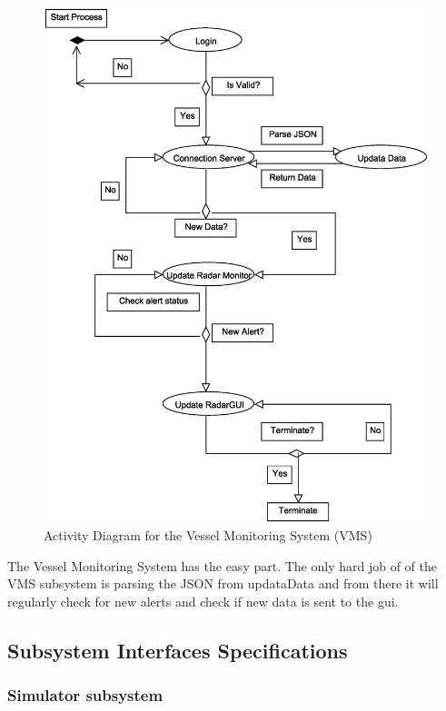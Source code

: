 \documentclass{article}
\begin{document}
\break

\begin{figure}[!htb]
\caption{Activity Diagram for the Vessel Monitoring System (VMS) }
\centering
\includegraphics[scale=0.2]{diagrams/vms-activity-diagram.eps}
\end{figure}

The Vessel Monitoring System has the easy part. The only hard job of of the VMS subsystem is parsing the JSON from updataData and from there it will regularly check for new alerts and check if new data is sent to the gui.

\subsection{Subsystem Interfaces Specifications} %

\subsubsection{Simulator subsystem} %
\end{document}
